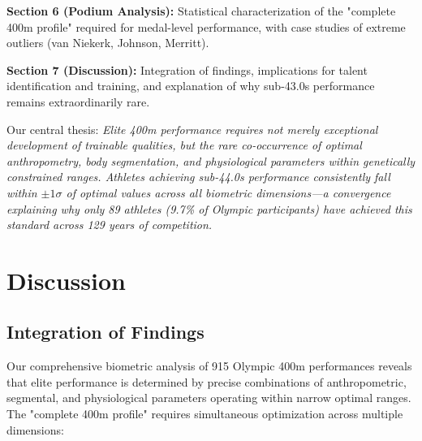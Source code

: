 \documentclass[twocolumn,10pt]{article}
\begin{document}
\textbf{Section 6 (Podium Analysis):} Statistical characterization of the "complete 400m profile" required for medal-level performance, with case studies of extreme outliers (van Niekerk, Johnson, Merritt).

\textbf{Section 7 (Discussion):} Integration of findings, implications for talent identification and training, and explanation of why sub-43.0s performance remains extraordinarily rare.

Our central thesis: \textit{Elite 400m performance requires not merely exceptional development of trainable qualities, but the rare co-occurrence of optimal anthropometry, body segmentation, and physiological parameters within genetically constrained ranges. Athletes achieving sub-44.0s performance consistently fall within $\pm 1\sigma$ of optimal values across all biometric dimensions—a convergence explaining why only 89 athletes (9.7\% of Olympic participants) have achieved this standard across 129 years of competition.}







\section{Discussion}

\subsection{Integration of Findings}

Our comprehensive biometric analysis of 915 Olympic 400m performances reveals that elite performance is determined by precise combinations of anthropometric, segmental, and physiological parameters operating within narrow optimal ranges. The "complete 400m profile" requires simultaneous optimization across multiple dimensions:
\end{document}
